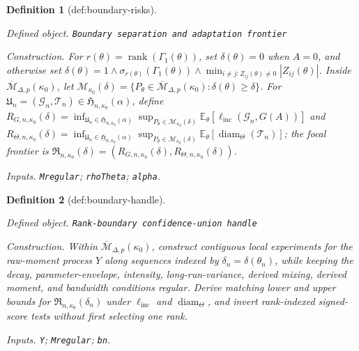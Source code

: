 \documentclass{article}
\newtheorem{definition}{Definition}
\begin{document}
\begin{definition}[def:boundary-risks]\label{def:boundary-risks}
\par\smallskip\noindent\emph{Defined object.} \texttt{Boundary separation and adaptation frontier}
\par\smallskip\noindent\emph{Construction.} For \(r(\theta)=\operatorname{rank}(\Gamma_1(\theta))\), set \(\delta(\theta)=0\) when \(A=0\), and otherwise set \(\delta(\theta)=1\wedge\sigma_{r(\theta)}(\Gamma_1(\theta))\wedge\min_{i\neq j:Z_{ij}(\theta)\neq0}|Z_{ij}(\theta)|\). Inside \(\overline{\mathcal M}_{\Delta,p}(\kappa_0)\), let \(\mathcal M_{\kappa_0}(\delta)=\{P_{\theta}\in\overline{\mathcal M}_{\Delta,p}(\kappa_0):\delta(\theta)\geq\delta\}\). For \(\mathfrak U_n=(\mathcal G_n,\mathcal T_n)\in\mathfrak H_{n,\kappa_0}(\alpha)\), define \(R_{G,n,\kappa_0}(\delta)=\inf_{\mathfrak U_n\in\mathfrak H_{n,\kappa_0}(\alpha)}\sup_{P_{\theta}\in\mathcal M_{\kappa_0}(\delta)}\mathbb E_{\theta}[\ell_{\mathrm{inc}}(\mathcal G_n,G(A))]\) and \(R_{\Theta,n,\kappa_0}(\delta)=\inf_{\mathfrak U_n\in\mathfrak H_{n,\kappa_0}(\alpha)}\sup_{P_{\theta}\in\mathcal M_{\kappa_0}(\delta)}\mathbb E_{\theta}[\operatorname{diam}_{\Theta}(\mathcal T_n)]\); the focal frontier is \(\mathfrak R_{n,\kappa_0}(\delta)=(R_{G,n,\kappa_0}(\delta),R_{\Theta,n,\kappa_0}(\delta))\).
\par\smallskip\noindent\emph{Inputs.} \texttt{Mregular}; \texttt{rhoTheta}; \texttt{alpha}.
\end{definition}

\begin{definition}[def:boundary-handle]\label{def:boundary-handle}
\par\smallskip\noindent\emph{Defined object.} \texttt{Rank-\allowbreak{}boundary confidence-\allowbreak{}union handle}
\par\smallskip\noindent\emph{Construction.} Within \(\overline{\mathcal M}_{\Delta,p}(\kappa_0)\), construct contiguous local experiments for the raw-moment process \(Y\) along sequences indexed by \(\delta_n=\delta(\theta_n)\), while keeping the decay, parameter-envelope, intensity, long-run-variance, derived mixing, derived moment, and bandwidth conditions regular. Derive matching lower and upper bounds for \(\mathfrak R_{n,\kappa_0}(\delta_n)\) under \(\ell_{\mathrm{inc}}\) and \(\operatorname{diam}_{\Theta}\), and invert rank-indexed signed-score tests without first selecting one rank.
\par\smallskip\noindent\emph{Inputs.} \texttt{Y}; \texttt{Mregular}; \texttt{bn}.
\end{definition}
\end{document}
